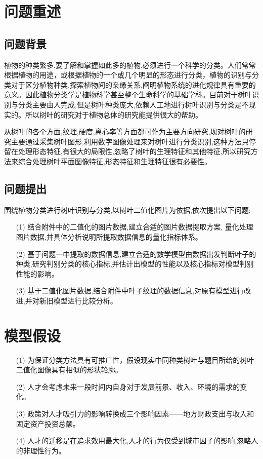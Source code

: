 \documentclass{whutmod}
\begin{document}
	\section{问题重述}	
	\subsection{问题背景}
    植物的种类繁多,要了解和掌握如此多的植物,必须进行一个科学的分类。人们常常根据植物的用途，或根据植物的一个或几个明显的形态进行分类，植物的识别与分类对于区分植物种类,探索植物间的亲缘关系,阐明植物系统的进化规律具有重要的意义。因此植物分类学是植物科学甚至整个生命科学的基础学科。目前对于树叶识别与分类主要由人完成,但是树叶种类庞大,依赖人工地进行树叶识别与分类是不现实的。所以树叶的研究对于植物总体的研究能提供很大的帮助。
    
    从树叶的各个方面,纹理,硬度,离心率等方面都可作为主要方向研究,现对树叶的研究主要通过采集树叶图形,利用数字图像处理来对树叶进行分类识别,这种方法只停留在处理形态特征,有很大的局限性,忽略了树叶的生理特征和其他特征,所以研究方法来综合处理树叶平面图像特征,形态特征和生理特征很有必要性。
    
    

	\subsection{问题提出}
    围绕植物分类进行树叶识别与分类,以树叶二值化图片为依据,依次提出以下问题:
		 
	\begin{itemize}
	\item [(1)] 结合附件中的二值化的图片数据,建立合适的图片数据提取方案, 量化处理图片数据,并具体分析说明所提取数据信息的量化指标体系。
	\item [(2)] 基于问题一中提取的数据信息,建立合适的数学模型由数据出发判断叶子的种类,研究判别分类的核心指标,并估计出模型的性能以及核心指标对模型判别性能的影响。
	\item [(3)] 基于二值化图片数据,结合附件中叶子纹理的数据信息,对原有模型进行改进,并对新旧模型进行比较分析。
	\end{itemize}
	
	\section{模型假设}
	\begin{itemize}
		\item [(1)] 为保证分类方法具有可推广性，假设现实中同种类树叶与题目所给的树叶二值化图像具有相似的形状轮廓。
		\item [(2)] 人才会考虑未来一段时间内自身对于发展前景、收入、环境的需求的变化。
		\item [(3)] 政策对人才吸引力的影响转换成三个影响因素——地方财政支出与收入和固定资产投资总额。
		\item [(4)] 人才的迁移是在追求效用最大化,人才的行为仅受到城市因子的影响,忽略人的非理性行为。
	\end{itemize}
	
\end{document}
